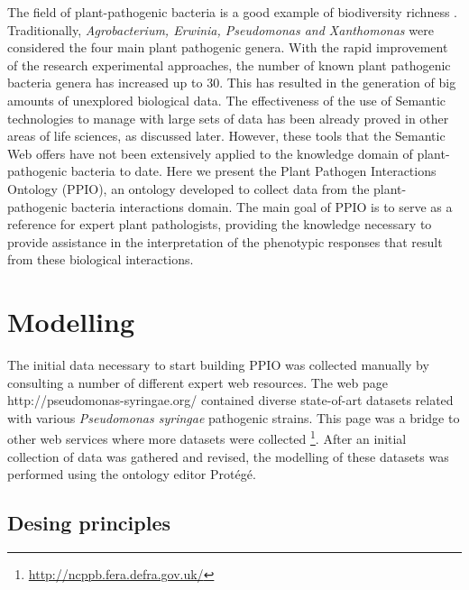 \documentclass[sw]{iosart2c}
\newcommand{\myurl}[1]{\footnote{\url{#1}}}
\begin{document}
The field of plant-pathogenic bacteria is a good example of biodiversity richness \cite{Bull2010}. Traditionally, {\itshape Agrobacterium, Erwinia, Pseudomonas and Xanthomonas} were considered the four main plant pathogenic genera. With the rapid improvement of the research experimental approaches, the number of known plant pathogenic bacteria genera has increased up to 30. This has resulted in the generation of big amounts of unexplored biological data. The effectiveness of the use of Semantic technologies to manage with large sets of data has been already proved in other areas of life sciences, as discussed later. However, these tools that the Semantic Web offers have not been extensively applied to the knowledge domain of plant-pathogenic bacteria to date. Here we present the Plant Pathogen Interactions Ontology (PPIO), an ontology developed to collect data from the plant-pathogenic bacteria interactions domain. The main goal of PPIO is to serve as a reference for expert plant pathologists, providing the knowledge necessary to provide assistance in the interpretation of the phenotypic responses that result from these biological interactions.




\section{Modelling}

The initial data necessary to start building PPIO was collected manually by consulting a number of different expert web resources. The web page http://pseudomonas-syringae.org/ contained diverse state-of-art datasets related with various {\itshape Pseudomonas syringae} pathogenic strains. This page was a bridge to other web services where more datasets were collected \myurl{http://ncppb.fera.defra.gov.uk/}. After an initial collection of data was gathered and revised, the modelling of these datasets was performed using the ontology editor Prot\'eg\'e.

\subsection{Desing principles}
\end{document}
